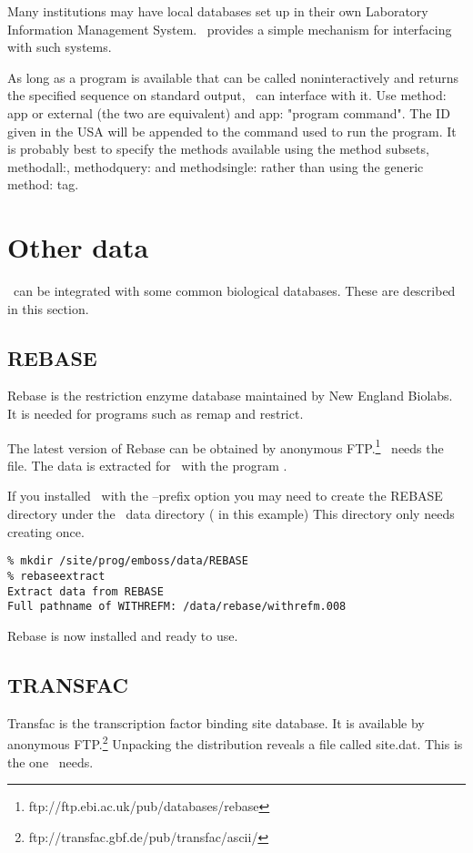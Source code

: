 \documentclass{report}
\begin{document}
Many institutions may have local databases set up in their own Laboratory Information Management System. \EMBOSS\ provides a simple mechanism for interfacing with such systems.

As long as a program is available that can be called noninteractively and returns the specified sequence on standard output, \EMBOSS\ can interface with it.
Use method: app or external (the two are equivalent) and app: "program command".
The ID given in the USA will be appended to the command used to run the program. It is probably best to specify the methods available using the method subsets, methodall:, methodquery: and methodsingle: rather than using the generic method: tag.


\section{Other data}

\EMBOSS\ can be integrated with some common biological databases. These are described in this section.

      \subsection{REBASE}

      Rebase is the restriction enzyme database maintained by New England Biolabs. It is needed for programs such as remap and restrict.

The latest version of Rebase can be obtained by anonymous FTP.\footnote{ftp://ftp.ebi.ac.uk/pub/databases/rebase} \EMBOSS\ needs the  file. The data is extracted for \EMBOSS\ with the program .

If you installed \EMBOSS\ with the --prefix option you may need to create the REBASE directory under the \EMBOSS\ data directory ( in this example) This directory only needs creating once.
\begin{verbatim}
% mkdir /site/prog/emboss/data/REBASE
% rebaseextract
Extract data from REBASE
Full pathname of WITHREFM: /data/rebase/withrefm.008
\end{verbatim}
Rebase is now installed and ready to use.

      \subsection{TRANSFAC}

Transfac is the transcription factor binding site database. It is available by anonymous FTP.\footnote{ftp://transfac.gbf.de/pub/transfac/ascii/} 
Unpacking the distribution reveals a file called site.dat. This is the one \EMBOSS\ needs.
\end{document}
